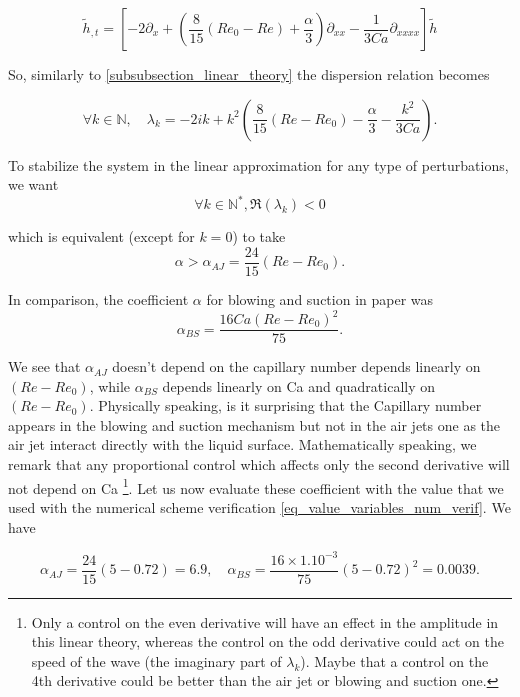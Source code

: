 \documentclass[12pt]{article}
\begin{document}
\begin{equation}
\tilde{h}_{,t} = \left[ -2\partial_x + \left( \frac{8}{15}(Re_0-Re)+\frac{\alpha}{3}\right)\partial_{xx} - \frac{1}{3Ca}\partial_{xxxx}\right]\tilde{h} 
\end{equation}

So, similarly to \eqref{subsubsection_linear_theory} the dispersion relation becomes

\begin{equation}\label{eq_dispertion_prop_ctrl}
    \forall k\in \mathbb{N},\quad \lambda_k = -2ik+ k^2\left(\frac{8}{15}(Re-Re_0)-\frac{\alpha}{3}-\frac{k^2}{3Ca}\right).
\end{equation}

To stabilize the system in the linear approximation for any type of perturbations, we want $$\forall k \in \mathbb{N}^*, \mathfrak{R}(\lambda_k) <0$$

which is equivalent (except for $k=0$) to take 
\begin{equation}
    \alpha > \alpha_{AJ}= \frac{24}{15}(Re-Re_0).
\end{equation}


In comparison, the coefficient $\alpha$ for blowing and suction in paper \cite{Thompson_2016_prop_ctrl} was 
\begin{equation}
    \alpha_{BS} = \frac{16Ca(Re-Re_0)^2}{75}.
\end{equation}

We see that $\alpha_{AJ}$ doesn't depend on the capillary number depends linearly on $(Re-Re_0)$, while $\alpha_{BS}$ depends linearly on Ca and quadratically on $(Re-Re_0)$. Physically speaking, is it surprising that the Capillary number appears in the blowing and suction mechanism but not in the air jets one as the air jet interact directly with the liquid surface. Mathematically speaking, we remark that any proportional control which affects only the second derivative will not depend on Ca \footnote{Only a control on the even derivative will have an effect in the amplitude in this linear theory, whereas the control on the odd derivative could act on the speed of the wave (the imaginary part of $\lambda_k$). Maybe that a control on the 4th derivative could be better than the air jet or blowing and suction one.}. Let us now evaluate these coefficient with the value that we used with the numerical scheme verification \eqref{eq_value_variables_num_verif}. We have 

$$\alpha_{AJ} = \frac{24}{15}(5-0.72) = 6.9, \quad \alpha_{BS} = \frac{16\times 1.10^{-3}}{75}(5-0.72)^2= 0.0039.$$
\end{document}
